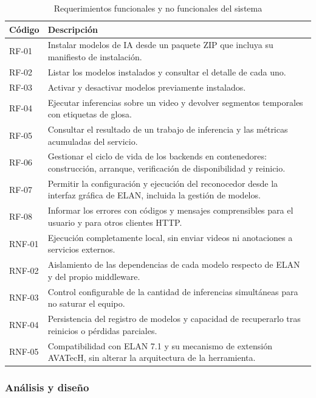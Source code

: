 \begin{table}[H]
\centering
\caption{Requerimientos funcionales y no funcionales del sistema}
\label{tab:requerimientos}
\footnotesize
\renewcommand{\arraystretch}{1.18}
\setlength{\tabcolsep}{5pt}

\begin{tabular}{
    >{\centering\arraybackslash}p{1.4cm}
    >{\raggedright\arraybackslash}p{11.6cm}
}
\toprule
\textbf{Código} & \textbf{Descripción} \\
\midrule
RF-01 & Instalar modelos de IA desde un paquete ZIP que incluya su manifiesto de instalación. \\
RF-02 & Listar los modelos instalados y consultar el detalle de cada uno. \\
RF-03 & Activar y desactivar modelos previamente instalados. \\
RF-04 & Ejecutar inferencias sobre un video y devolver segmentos temporales con etiquetas de glosa. \\
RF-05 & Consultar el resultado de un trabajo de inferencia y las métricas acumuladas del servicio. \\
RF-06 & Gestionar el ciclo de vida de los backends en contenedores: construcción, arranque, verificación de disponibilidad y reinicio. \\
RF-07 & Permitir la configuración y ejecución del reconocedor desde la interfaz gráfica de ELAN, incluida la gestión de modelos. \\
RF-08 & Informar los errores con códigos y mensajes comprensibles para el usuario y para otros clientes HTTP. \\
\midrule
RNF-01 & Ejecución completamente local, sin enviar videos ni anotaciones a servicios externos. \\
RNF-02 & Aislamiento de las dependencias de cada modelo respecto de ELAN y del propio middleware. \\
RNF-03 & Control configurable de la cantidad de inferencias simultáneas para no saturar el equipo. \\
RNF-04 & Persistencia del registro de modelos y capacidad de recuperarlo tras reinicios o pérdidas parciales. \\
RNF-05 & Compatibilidad con ELAN 7.1 y su mecanismo de extensión AVATecH, sin alterar la arquitectura de la herramienta. \\
\bottomrule
\end{tabular}
\end{table}

\subsubsection{Análisis y diseño}


